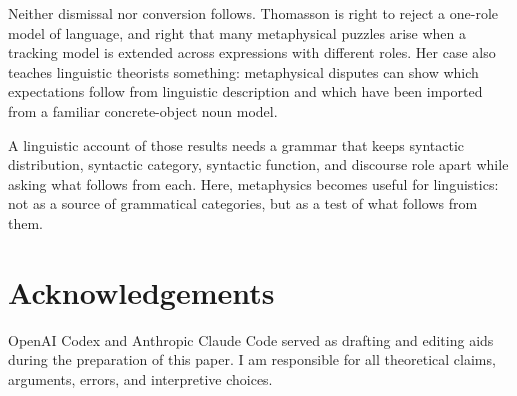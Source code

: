 \documentclass[12pt]{article}
\begin{document}
Neither dismissal nor conversion follows. Thomasson is right to reject a one-role model of language, and right that many metaphysical puzzles arise when a tracking model is extended across expressions with different roles. Her case also teaches linguistic theorists something: metaphysical disputes can show which expectations follow from linguistic description and which have been imported from a familiar concrete-object noun model.

A linguistic account of those results needs a grammar that keeps syntactic distribution, syntactic category, syntactic function, and discourse role apart while asking what follows from each. Here, metaphysics becomes useful for linguistics: not as a source of grammatical categories, but as a test of what follows from them.

\section*{Acknowledgements}

OpenAI Codex and Anthropic Claude Code served as drafting and editing aids during the preparation of this paper. I am responsible for all theoretical claims, arguments, errors, and interpretive choices.

\clearpage
\printbibliography
\end{document}
